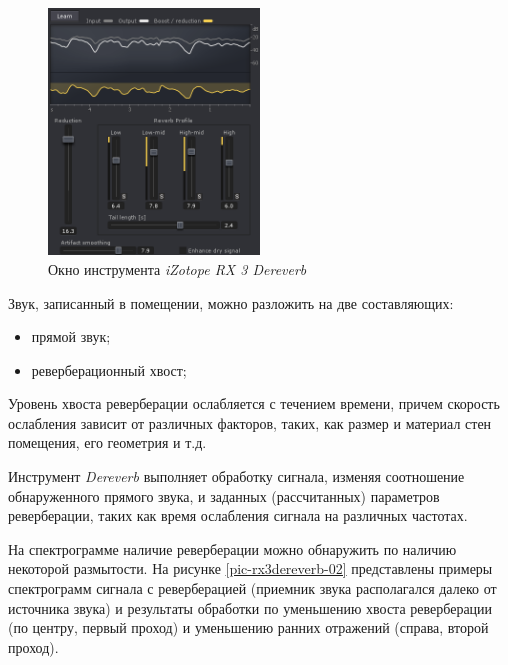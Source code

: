 \documentclass[oneside, final, 14pt]{extreport}
\begin{document}
\begin{figure}[h!]
  \centering
  \includegraphics[width=0.5\textwidth]{pic-rx3dereverb-01}
  \caption{Окно инструмента \emph{iZotope RX 3 Dereverb}}
  \label{pic-rx3dereverb-01}
\end{figure}

Звук, записанный в помещении, можно разложить на две составляющих:
\begin{itemize}
  \item прямой звук;
  \item реверберационный хвост;
\end{itemize}

Уровень хвоста реверберации ослабляется с течением времени, причем скорость ослабления зависит от различных факторов, таких, как размер и материал стен помещения, его геометрия и т.д.

Инструмент \emph{Dereverb} выполняет обработку сигнала, изменяя соотношение обнаруженного прямого звука, и заданных (рассчитанных) параметров реверберации, таких как время ослабления сигнала на различных частотах.

На спектрограмме наличие реверберации можно обнаружить по наличию некоторой размытости. На рисунке \ref{pic-rx3dereverb-02} представлены примеры спектрограмм сигнала с реверберацией (приемник звука располагался далеко от источника звука) и результаты обработки по уменьшению хвоста реверберации (по центру, первый проход) и уменьшению ранних отражений (справа, второй проход).
\end{document}
